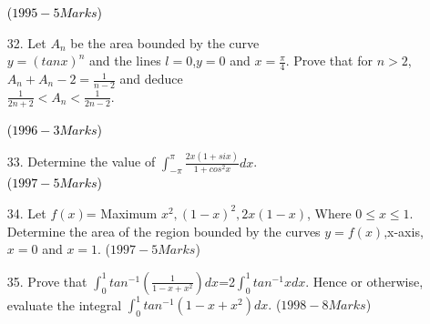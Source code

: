 \documentclass[journal,12pt,twocolumn]{IEEEtran}
\theoremstyle{remark}
\begin{document}
\begin{enumerate}
\hfill{\textcolor{black}{($1995-5 Marks$)}}\\

\item[32.]  Let $A_n$ be the area bounded by the curve\\ $y=(tanx)^n$ and the lines $l=0$,$y=0$ and $x=\frac{\pi}{4}$. Prove that for $n>2$, $A_n+A_n-2=\frac{1}{n-2}$ and deduce\\ $\frac{1}{2n+2}<A_n<\frac{1}{2n-2}$.

	\hfill{\textcolor{black}{($1996-3 Marks$)}}\\

\item[33.]  Determine the value of $\int_{-\pi}^{\pi}\frac{2x(1+six)}{1+cos^2x}dx$.\\


\hfill{\textcolor{black}{($1997-5 Marks$)}}

\item[34.]  Let $f(x)$= Maximum {$x^2,(1-x)^2,2x(1-x)$}, Where $0 \leq x \leq 1$. Determine the area of the region bounded by the curves $y=f(x)$,x-axis,$x=0$ and $x=1$.
\hfill{($1997-5 Marks$)}
\item[35.]  Prove that $\int_{0}^{1}tan^{-1}(\frac{1}{1-x+x^2})dx$=2$\int_{0}^{1} tan^{-1}xdx$. Hence or otherwise, evaluate the integral $\int_{0}^{1}tan^{-1}(1-x+x^2)dx.$
\hfill{($1998-8 Marks$)}
\end{enumerate}
\end{document}

